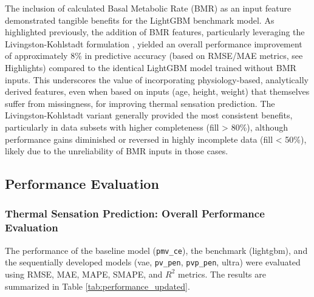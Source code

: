 
The inclusion of calculated Basal Metabolic Rate (BMR) as an input feature demonstrated tangible benefits for the LightGBM benchmark model. As highlighted previously, the addition of BMR features, particularly leveraging the Livingston-Kohlstadt formulation \cite{LivingstonKohlstadt2005}, yielded an overall performance improvement of approximately 8\% in predictive accuracy (based on RMSE/MAE metrics, see Highlights) compared to the identical LightGBM model trained without BMR inputs. This underscores the value of incorporating physiology-based, analytically derived features, even when based on inputs (age, height, weight) that themselves suffer from missingness, for improving thermal sensation prediction. The Livingston-Kohlstadt variant generally provided the most consistent benefits, particularly in data subsets with higher completeness (fill > 80\%), although performance gains diminished or reversed in highly incomplete data (fill < 50\%), likely due to the unreliability of BMR inputs in those cases.


\subsection{Performance Evaluation}
\subsubsection{Thermal Sensation Prediction: Overall Performance Evaluation}
The performance of the baseline model (\texttt{pmv\_ce}), the benchmark (lightgbm), and the sequentially developed models (vae, \texttt{pv\_pen}, \texttt{pvp\_pen}, ultra) were evaluated using RMSE, MAE, MAPE, SMAPE, and $R^2$ metrics. The results are summarized in Table \ref{tab:performance_updated}.

